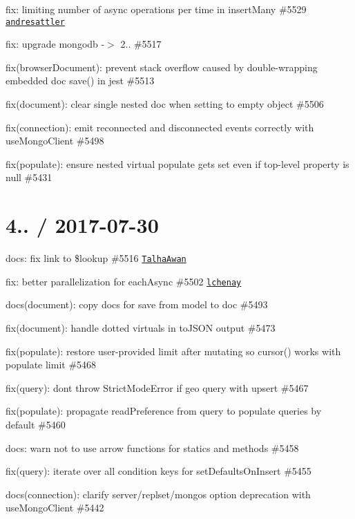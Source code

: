 \begin{DoxyItemize}
\item fix\+: limiting number of async operations per time in insert\+Many \#5529 \href{https://github.com/andresattler}{\tt andresattler}
\item fix\+: upgrade mongodb -\/$>$ 2.. \#5517
\item fix(browser\+Document)\+: prevent stack overflow caused by double-\/wrapping embedded doc save() in jest \#5513
\item fix(document)\+: clear single nested doc when setting to empty object \#5506
\item fix(connection)\+: emit reconnected and disconnected events correctly with use\+Mongo\+Client \#5498
\item fix(populate)\+: ensure nested virtual populate gets set even if top-\/level property is null \#5431
\end{DoxyItemize}

\section*{4.. / 2017-\/07-\/30 }


\begin{DoxyItemize}
\item docs\+: fix link to \$lookup \#5516 \href{https://github.com/TalhaAwan}{\tt Talha\+Awan}
\item fix\+: better parallelization for each\+Async \#5502 \href{https://github.com/lchenay}{\tt lchenay}
\item docs(document)\+: copy docs for save from model to doc \#5493
\item fix(document)\+: handle dotted virtuals in to\+J\+S\+ON output \#5473
\item fix(populate)\+: restore user-\/provided limit after mutating so cursor() works with populate limit \#5468
\item fix(query)\+: don\textquotesingle{}t throw Strict\+Mode\+Error if geo query with upsert \#5467
\item fix(populate)\+: propagate read\+Preference from query to populate queries by default \#5460
\item docs\+: warn not to use arrow functions for statics and methods \#5458
\item fix(query)\+: iterate over all condition keys for set\+Defaults\+On\+Insert \#5455
\item docs(connection)\+: clarify server/replset/mongos option deprecation with use\+Mongo\+Client \#5442
\end{DoxyItemize}

